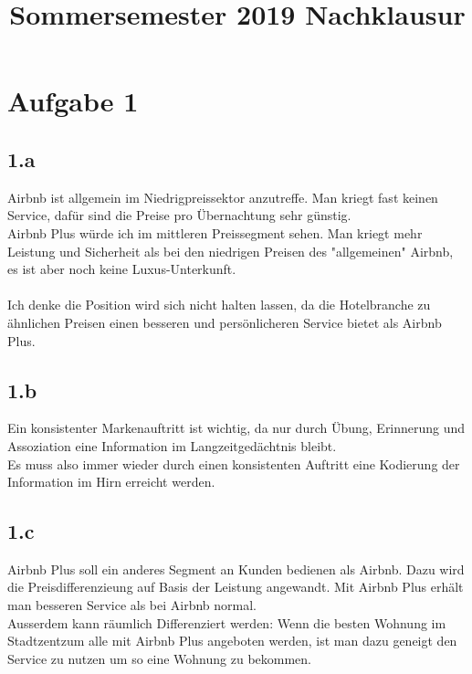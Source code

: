 

\title{Sommersemester 2019 Nachklausur}
\maketitle



\section{Aufgabe 1}
\subsection{1.a}
    Airbnb ist allgemein im Niedrigpreissektor anzutreffe. Man kriegt fast keinen Service, dafür sind die Preise pro Übernachtung sehr günstig. \\
    Airbnb Plus würde ich im mittleren Preissegment sehen. Man kriegt mehr Leistung und Sicherheit als bei den niedrigen Preisen des "allgemeinen" Airbnb, es ist aber noch keine Luxus-Unterkunft. \\
    \ \\
    Ich denke die Position wird sich nicht halten lassen, da die Hotelbranche zu ähnlichen Preisen einen besseren und persönlicheren Service bietet als Airbnb Plus. \\

\subsection{1.b}
    Ein konsistenter Markenauftritt ist wichtig, da nur durch Übung, Erinnerung und Assoziation eine Information im Langzeitgedächtnis bleibt. \\
    Es muss also immer wieder durch einen konsistenten Auftritt eine Kodierung der Information im Hirn erreicht werden.

\subsection{1.c}
    Airbnb Plus soll ein anderes Segment an Kunden bedienen als Airbnb. Dazu wird die Preisdifferenzieung auf Basis der Leistung angewandt. Mit Airbnb Plus erhält man besseren Service als bei Airbnb normal. \\
    Ausserdem kann räumlich Differenziert werden: Wenn die besten Wohnung im Stadtzentzum alle mit Airbnb Plus angeboten werden, ist man dazu geneigt den Service zu nutzen um so eine Wohnung zu bekommen.

